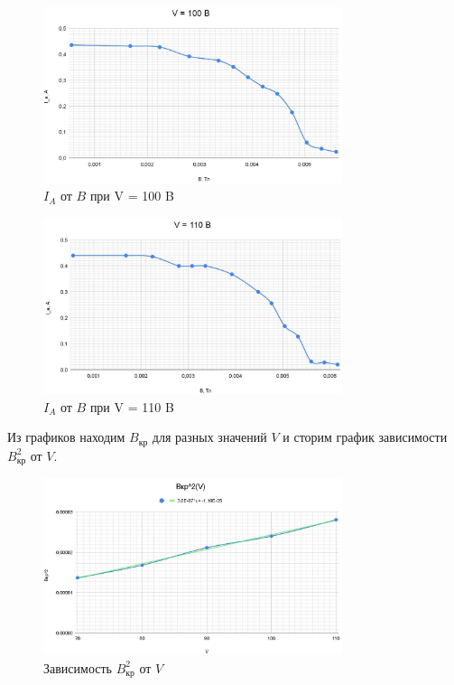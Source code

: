 \documentclass[a4paper]{article}
\begin{document}
\begin{figure}[h]
	\begin{center}
		\includegraphics[width = 0.78\textwidth]{V100B}
		\caption{$I_A$ от $B$ при V = 100 B}
	\end{center}
\end{figure}

\begin{figure}[h]
	\begin{center}
		\includegraphics[width = 0.78\textwidth]{V110B}
		\caption{$I_A$ от $B$ при V = 110 B}
	\end{center}
\end{figure}

Из графиков находим $B_\text{кр}$ для разных значений $V$ и сторим график зависимости $B_\text{кр}^2$ от $V$.

\begin{figure}[h]
	\begin{center}
		\includegraphics[width = 0.78\textwidth]{Bкр(V)}
		\caption{Зависимость $B_\text{кр}^2$ от $V$}
	\end{center}
\end{figure}
\end{document}
